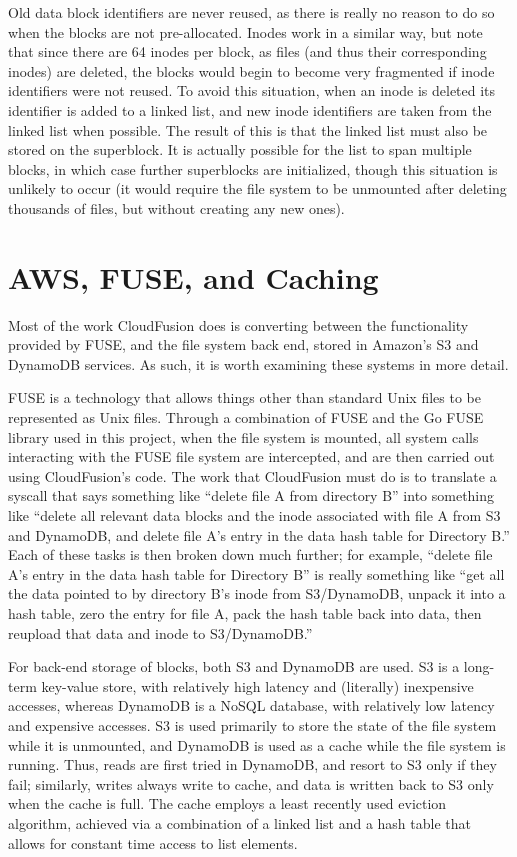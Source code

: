 \documentclass[11pt]{article}
\begin{document}
Old data block identifiers are never reused, as there is really no reason to do so when the blocks are not pre-allocated. Inodes work in a similar way, but note that since there are 64 inodes per block, as files (and thus their corresponding inodes) are deleted, the blocks would begin to become very fragmented if inode identifiers were not reused. To avoid this situation, when an inode is deleted its identifier is added to a linked list, and new inode identifiers are taken from the linked list when possible. The result of this is that the linked list must also be stored on the superblock. It is actually possible for the list to span multiple blocks, in which case further superblocks are initialized, though this situation is unlikely to occur (it would require the file system to be unmounted after deleting thousands of files, but without creating any new ones).

\section{AWS, FUSE, and Caching}
Most of the work CloudFusion does is converting between the functionality provided by FUSE, and the file system back end, stored in Amazon's S3 and DynamoDB services. As such, it is worth examining these systems in more detail.

FUSE is a technology that allows things other than standard Unix files to be represented as Unix files. Through a combination of FUSE and the Go FUSE library used in this project, when the file system is mounted, all system calls interacting with the FUSE file system are intercepted, and are then carried out using CloudFusion's code. The work that CloudFusion must do is to translate a syscall that says something like ``delete file A from directory B'' into something like ``delete all relevant data blocks and the inode associated with file A from S3 and DynamoDB, and delete file A's entry in the data hash table for Directory B.'' Each of these tasks is then broken down much further; for example, ``delete file A's entry in the data hash table for Directory B'' is really something like ``get all the data pointed to by directory B's inode from S3/DynamoDB, unpack it into a hash table, zero the entry for file A, pack the hash table back into data, then reupload that data and inode to S3/DynamoDB.''

For back-end storage of blocks, both S3 and DynamoDB are used. S3 is a long-term key-value store, with relatively high latency and (literally) inexpensive accesses, whereas DynamoDB is a NoSQL database, with relatively low latency and expensive accesses. S3 is used primarily to store the state of the file system while it is unmounted, and DynamoDB is used as a cache while the file system is running. Thus, reads are first tried in DynamoDB, and resort to S3 only if they fail; similarly, writes always write to cache, and data is written back to S3 only when the cache is full. The cache employs a least recently used eviction algorithm, achieved via a combination of a linked list and a hash table that allows for constant time access to list elements.
\end{document}
